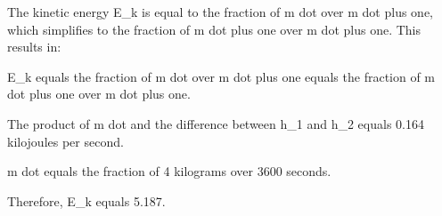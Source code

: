 The kinetic energy E_k is equal to the fraction of m dot over m dot plus one, which simplifies to the fraction of m dot plus one over m dot plus one. This results in:

E_k equals the fraction of m dot over m dot plus one equals the fraction of m dot plus one over m dot plus one.

The product of m dot and the difference between h_1 and h_2 equals 0.164 kilojoules per second.

m dot equals the fraction of 4 kilograms over 3600 seconds.

Therefore, E_k equals 5.187.
